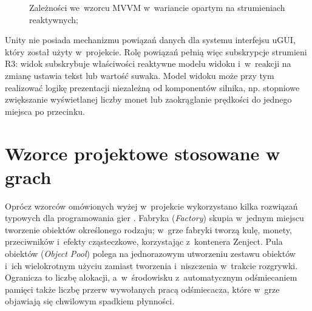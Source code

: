 \begin{figure}[!htb]
  \centering
  \caption{Zależności we~wzorcu MVVM w~wariancie opartym na strumieniach reaktywnych; \zrodloWlasne}
  \label{rys:mvvm}
\end{figure}

Unity nie posiada mechanizmu powiązań danych dla systemu interfejsu uGUI, który został
użyty w~projekcie. Rolę powiązań pełnią więc subskrypcje strumieni R3: widok subskrybuje
właściwości reaktywne modelu widoku i~w~reakcji na zmianę ustawia tekst lub wartość
suwaka. Model widoku może przy tym realizować logikę prezentacji niezależną od komponentów
silnika, np. stopniowe zwiększanie wyświetlanej liczby monet lub zaokrąglanie prędkości do
jednego miejsca po przecinku.

\section{Wzorce projektowe stosowane w grach}

Oprócz wzorców omówionych wyżej w~projekcie wykorzystano kilka rozwiązań typowych dla
programowania gier \cite{nystrom}. Fabryka (\emph{Factory}) skupia w~jednym miejscu
tworzenie obiektów określonego rodzaju; w~grze fabryki tworzą kulę, monety, przeciwników
i~efekty cząsteczkowe, korzystając z~kontenera Zenject. Pula obiektów (\emph{Object Pool})
polega na jednorazowym utworzeniu zestawu obiektów i~ich wielokrotnym użyciu zamiast
tworzenia i~niszczenia w~trakcie rozgrywki. Ogranicza to liczbę alokacji, a~w~środowisku
z~automatycznym odśmiecaniem pamięci także liczbę przerw wywołanych pracą odśmiecacza,
które w~grze objawiają się chwilowym spadkiem płynności.

